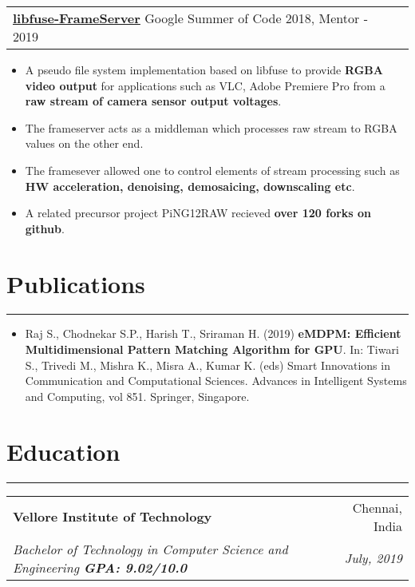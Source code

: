\documentclass[a4paper,6pt]{article}
\begin{document}
\hspace{5px}
\begin{tabularx}{\textwidth}{X r}
	{\textbf{\href{https://github.com/supragya/libfuse-FrameServer}{libfuse-FrameServer}}} \small Google Summer of Code 2018, Mentor - 2019& \\
\end{tabularx}
\begin{itemize}
    \item \small A pseudo file system implementation based on libfuse to provide \textcolor{mygray}{\textbf{RGBA video output}} for applications such as VLC, Adobe Premiere Pro from a \textcolor{mygray}{\textbf{raw stream of camera sensor output voltages}}.
    \item \small The frameserver acts as a middleman which processes raw stream to RGBA values on the other end.
    \item \small The framesever allowed one to control elements of stream processing such as \textcolor{mygray}{\textbf{HW acceleration, denoising, demosaicing, downscaling etc}}.
    \item \small A related precursor project PiNG12RAW recieved \textcolor{mygray}{\textbf{over 120 forks on github}}. 
    \normalsize
\end{itemize}


\section*{Publications}
\vspace{-8px}
\hrule
\vspace{8px}
\begin{itemize}
	\item \small Raj S., Chodnekar S.P., Harish T., Sriraman H. (2019) \textcolor{mygray}{\textbf{eMDPM: Efficient Multidimensional Pattern Matching Algorithm for GPU}}. In: Tiwari S., Trivedi M., Mishra K., Misra A., Kumar K. (eds) Smart Innovations in Communication and Computational Sciences. Advances in Intelligent Systems and Computing, vol 851. Springer, Singapore. 
\normalsize
\end{itemize}


\section*{Education}
\vspace{-8px}
\hrule
\vspace{4px}
\hspace{5px}
\begin{tabularx}{\textwidth}{X r}
	\textbf{Vellore Institute of Technology} & Chennai, India \\
	\textit{\small Bachelor of Technology in Computer Science and Engineering \textcolor{mygray}{\textbf{GPA: 9.02/10.0}}} & \textit{July, 2019} 
\end{tabularx}
\end{document}
